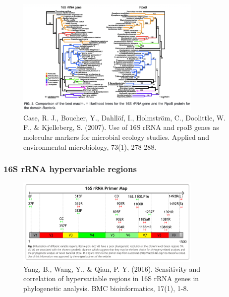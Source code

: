 \documentclass[
]{book}
\begin{document}
\begin{figure}
\centering
\includegraphics[width=0.8\textwidth,height=\textheight]{./Figures/RpoB.png}
\caption{Case, R. J., Boucher, Y., Dahllöf, I., Holmström, C., Doolittle, W. F., \& Kjelleberg, S. (2007). Use of 16S rRNA and rpoB genes as molecular markers for microbial ecology studies. Applied and environmental microbiology, 73(1), 278-288.}
\end{figure}

\hypertarget{s-rrna-hypervariable-regions}{%
\subsubsection{16S rRNA hypervariable regions}\label{s-rrna-hypervariable-regions}}

\begin{figure}
\centering
\includegraphics[width=0.8\textwidth,height=\textheight]{./Figures/Hypervariable1.png}
\caption{Yang, B., Wang, Y., \& Qian, P. Y. (2016). Sensitivity and correlation of hypervariable regions in 16S rRNA genes in phylogenetic analysis. BMC bioinformatics, 17(1), 1-8.}
\end{figure}
\end{document}
